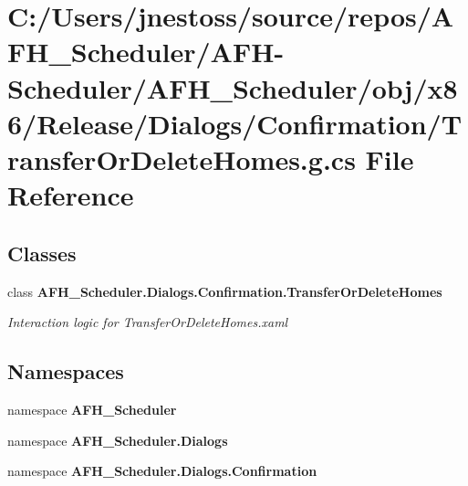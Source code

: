 \section{C\+:/\+Users/jnestoss/source/repos/\+A\+F\+H\+\_\+\+Scheduler/\+A\+F\+H-\/\+Scheduler/\+A\+F\+H\+\_\+\+Scheduler/obj/x86/\+Release/\+Dialogs/\+Confirmation/\+Transfer\+Or\+Delete\+Homes.g.\+cs File Reference}
\label{x86_2_release_2_dialogs_2_confirmation_2_transfer_or_delete_homes_8g_8cs}
\subsection*{Classes}
\begin{DoxyCompactItemize}
\item 
class \textbf{ A\+F\+H\+\_\+\+Scheduler.\+Dialogs.\+Confirmation.\+Transfer\+Or\+Delete\+Homes}
\begin{DoxyCompactList}\small\item\em Interaction logic for Transfer\+Or\+Delete\+Homes.\+xaml \end{DoxyCompactList}\end{DoxyCompactItemize}
\subsection*{Namespaces}
\begin{DoxyCompactItemize}
\item 
namespace \textbf{ A\+F\+H\+\_\+\+Scheduler}
\item 
namespace \textbf{ A\+F\+H\+\_\+\+Scheduler.\+Dialogs}
\item 
namespace \textbf{ A\+F\+H\+\_\+\+Scheduler.\+Dialogs.\+Confirmation}
\end{DoxyCompactItemize}
